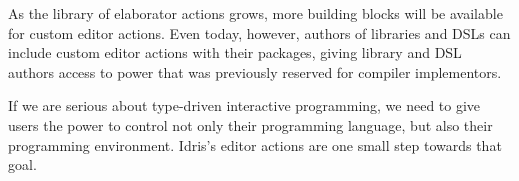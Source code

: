 As the library of elaborator actions grows, more building blocks will
be available for custom editor actions. Even today, however, authors
of libraries and DSLs can include custom editor actions with their
packages, giving library and DSL authors access to power that was
previously reserved for compiler implementors.

If we are serious about type-driven interactive programming, we need
to give users the power to control not only their programming
language, but also their programming environment. Idris's editor
actions are one small step towards that goal.

